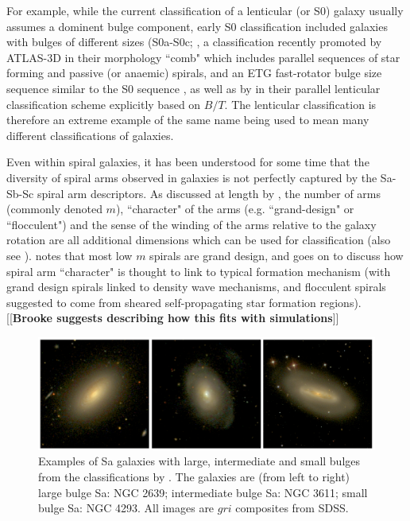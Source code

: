 \documentclass[usenatbib]{mn2e}
\newcommand{\comment}[2][todo]{{\color{#1}[[{\bf #2}]]}}
\begin{document}
 For example, while the current classification of a lenticular (or S0) galaxy usually assumes a dominent bulge component, early S0 classification included galaxies with bulges of different sizes (S0a-S0c; \citealt{SpitzerBaade1951, vandenBergh1976}, a classification recently promoted by ATLAS-3D in their morphology ``comb" which includes parallel sequences of star forming and passive (or anaemic) spirals, and an ETG fast-rotator bulge size sequence similar to the S0 sequence \citep{2011MNRAS.416.1680C}, as well as by \citet{Kormendy2012} in their parallel lenticular classification scheme explicitly based on $B/T$. The lenticular classification is therefore an extreme example of the same name being used to mean many different classifications of galaxies. 


 Even within spiral galaxies, it has been understood for some time that the diversity of spiral arms observed in galaxies is not perfectly captured by the Sa-Sb-Sc spiral arm descriptors. As discussed at length by \citet{Buta2013}, the number of arms (commonly denoted $m$), ``character" of the arms (e.g. ``grand-design" or ``flocculent") and the sense of the winding of the arms relative to the galaxy rotation are all additional dimensions which can be used for classification (also see \citealt{1987ApJ...314....3E,AnnLee2013}). \citet{Buta2013} notes that most low $m$ spirals are grand design, and goes on to discuss how spiral arm ``character" is thought to link to typical formation mechanism (with grand design spirals linked to density wave mechanisms, and flocculent spirals suggested to come from sheared self-propagating star formation regions). \comment{Brooke suggests describing how this fits with simulations}

\begin{figure}
\includegraphics[width=160mm]{ExampleSas.png}
\caption{Examples of Sa galaxies with large, intermediate and small bulges from the classifications by \citet{Hogg1993}.  The galaxies are (from left to right) large bulge Sa: NGC 2639; intermediate bulge Sa: NGC 3611; small bulge Sa: NGC 4293. All images are $gri$ composites from SDSS. \label{Sa}}
\end{figure}
\end{document}
